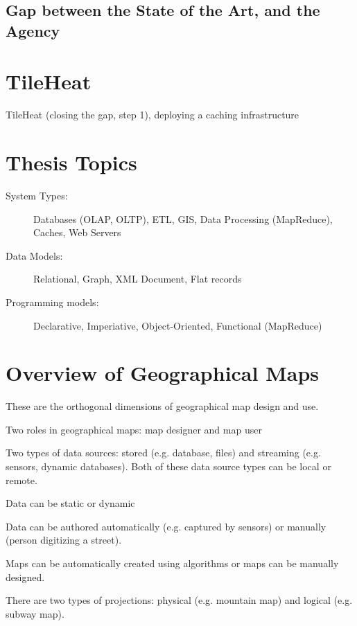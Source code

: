 \documentclass[11pt, oneside]{report}   	%
\begin{document}
\section{Gap between the State of the Art, and the Agency}

\chapter{TileHeat}
TileHeat (closing the gap, step 1), deploying a caching infrastructure




\chapter{Thesis Topics}

\begin{description}
\item [System Types:] Databases (OLAP, OLTP), ETL, GIS, Data Processing (MapReduce), Caches, Web Servers
\item [Data Models:] Relational, Graph, XML Document, Flat records 
\item [Programming models:] Declarative, Imperiative, Object-Oriented, Functional (MapReduce)
\end{description}

\chapter{Overview of Geographical Maps}

These are the orthogonal dimensions of geographical map design and use.

Two roles in geographical maps: map designer and map user

Two types of data sources: stored (e.g. database, files) and streaming (e.g. sensors, dynamic databases). Both of these data source types can be local or remote.

Data can be static or dynamic

Data can be authored automatically (e.g. captured by sensors) or manually (person digitizing a street).

Maps can be automatically created using algorithms or maps can be manually designed.

There are two types of projections: physical (e.g. mountain map) and logical (e.g. subway map).
\end{document}
